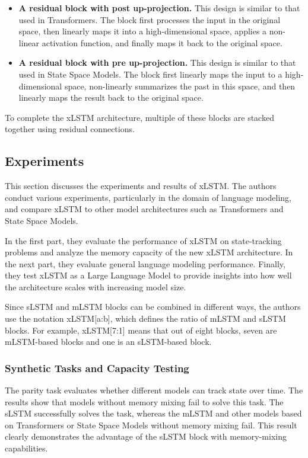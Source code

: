 \documentclass[a4paper,oneside,10pt,ngerman,english]{scrartcl}
\begin{document}
\begin{itemize}
	\item \textbf{A residual block with post up-projection.} This design is similar to that used in Transformers. The block first processes the input in the original space, then linearly maps it into a high-dimensional space, applies a non-linear activation function, and finally maps it back to the original space.
	
	\item \textbf{A residual block with pre up-projection.} This design is similar to that used in State Space Models. The block first linearly maps the input to a high-dimensional space, non-linearly summarizes the past in this space, and then linearly maps the result back to the original space.
\end{itemize}

To complete the xLSTM architecture, multiple of these blocks are stacked together using residual connections.

\subsection{Experiments}
\label{sec:experiments}

This section discusses the experiments and results of xLSTM. The authors conduct various experiments, particularly in the domain of language modeling, and compare xLSTM to other model architectures such as Transformers and State Space Models.

In the first part, they evaluate the performance of xLSTM on state-tracking problems and analyze the memory capacity of the new xLSTM architecture. In the next part, they evaluate general language modeling performance. Finally, they test xLSTM as a Large Language Model to provide insights into how well the architecture scales with increasing model size.

Since sLSTM and mLSTM blocks can be combined in different ways, the authors use the notation xLSTM[a:b], which defines the ratio of mLSTM and sLSTM blocks. For example, xLSTM[7:1] means that out of eight blocks, seven are mLSTM-based blocks and one is an sLSTM-based block.

\subsubsection{Synthetic Tasks and Capacity Testing}
\label{sec:synthetictasks}

The parity task evaluates whether different models can track state over time. The results show that models without memory mixing fail to solve this task. The sLSTM successfully solves the task, whereas the mLSTM and other models based on Transformers or State Space Models without memory mixing fail. This result clearly demonstrates the advantage of the sLSTM block with memory-mixing capabilities.
\end{document}
